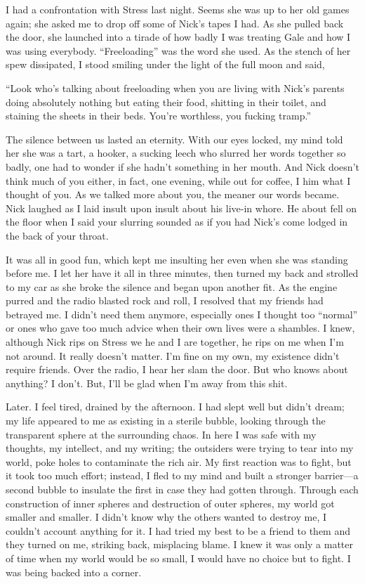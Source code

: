 I had a confrontation with Stress last night. Seems she was up to her
old games again; she asked me to drop off some of Nick's tapes I had. As
she pulled back the door, she launched into a tirade of how badly I was
treating Gale and how I was using everybody. ``Freeloading'' was the
word she used. As the stench of her spew dissipated, I stood smiling
under the light of the full moon and said,

``Look who's talking about freeloading when you are living with Nick's
parents doing absolutely nothing but eating their food, shitting in
their toilet, and staining the sheets in their beds. You're worthless,
you fucking tramp.''

The silence between us lasted an eternity. With our eyes locked, my mind
told her she was a tart, a hooker, a sucking leech who slurred her words
together so badly, one had to wonder if she hadn't something in her
mouth. And Nick doesn't think much of you either, in fact, one evening,
while out for coffee, I him what I thought of you. As we talked more
about you, the meaner our words became. Nick laughed as I laid insult
upon insult about his live-in whore. He about fell on the floor when I
said your slurring sounded as if you had Nick's come lodged in the back
of your throat.

It was all in good fun, which kept me insulting her even when she was
standing before me. I let her have it all in three minutes, then turned
my back and strolled to my car as she broke the silence and began upon
another fit. As the engine purred and the radio blasted rock and roll, I
resolved that my friends had betrayed me. I didn't need them anymore,
especially ones I thought too ``normal'' or ones who gave too much
advice when their own lives were a shambles. I knew, although Nick rips
on Stress we he and I are together, he rips on me when I'm not around.
It really doesn't matter. I'm fine on my own, my existence didn't
require friends. Over the radio, I hear her slam the door. But who knows
about anything? I don't. But, I'll be glad when I'm away from this shit.

Later. I feel tired, drained by the afternoon. I had slept well but
didn't dream; my life appeared to me as existing in a sterile bubble,
looking through the transparent sphere at the surrounding chaos. In here
I was safe with my thoughts, my intellect, and my writing; the outsiders
were trying to tear into my world, poke holes to contaminate the rich
air. My first reaction was to fight, but it took too much effort;
instead, I fled to my mind and built a stronger barrier---a second
bubble to insulate the first in case they had gotten through. Through
each construction of inner spheres and destruction of outer spheres, my
world got smaller and smaller. I didn't know why the others wanted to
destroy me, I couldn't account anything for it. I had tried my best to
be a friend to them and they turned on me, striking back, misplacing
blame. I knew it was only a matter of time when my world would be so
small, I would have no choice but to fight. I was being backed into a
corner.

